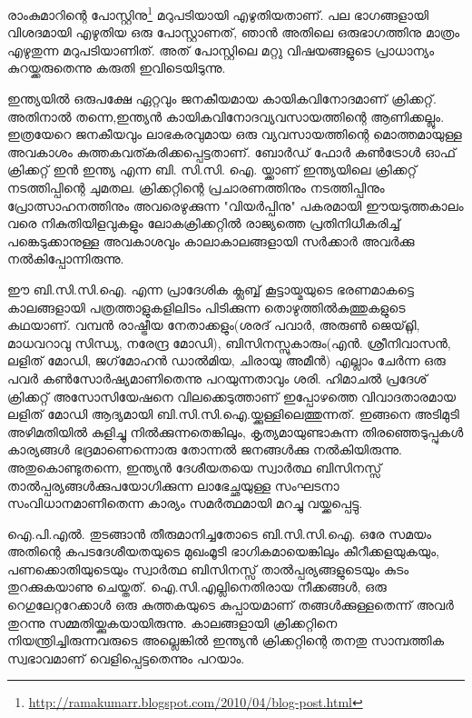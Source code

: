 \vskip 2pt


രാംകുമാറിന്റെ പോസ്റ്റിനു\footnote{\url{http://ramakumarr.blogspot.com/2010/04/blog-post.html}} മറുപടിയായി എഴുതിയതാണ്. പല ഭാഗങ്ങളായി വിശദമായി എഴുതിയ ഒരു പോസ്റ്റാണത്, ഞാന്‍ അതിലെ ഒരുഭാഗത്തിനു മാത്രം എഴുതുന്ന മറുപടിയാണിത്. അത് പോസ്റ്റിലെ മറ്റു വിഷയങ്ങളുടെ പ്രാധാന്യം കുറയ്ക്കരുതെന്നു കരുതി ഇവിടെയിടുന്നു.

ഇന്ത്യയില്‍ ഒരുപക്ഷേ ഏറ്റവും ജനകീയമായ കായികവിനോദമാണ് ക്രിക്കറ്റ്. അതിനാല്‍ തന്നെ,ഇന്ത്യന്‍ കായികവിനോദവ്യവസായത്തിന്റെ ആണിക്കല്ലും. ഇത്രയേറെ ജനകീയവും ലാഭകരവുമായ ഒരു വ്യവസായത്തിന്റെ മൊത്തമായുള്ള അവകാശം കുത്തകവത്കരിക്കപ്പെട്ടതാണ്. ബോര്‍ഡ് ഫോര്‍ കണ്‍ട്രോള്‍ ഓഫ് ക്രിക്കറ്റ് ഇന്‍ ഇന്ത്യ എന്ന ബി. സി.സി. ഐ. യ്ക്കാണ് ഇന്ത്യയിലെ ക്രിക്കറ്റ് നടത്തിപ്പിന്റെ ചുമതല. ക്രിക്കറ്റിന്റെ പ്രചാരണത്തിനും നടത്തിപ്പിനും പ്രോത്സാഹനത്തിനും അവരെഴുക്കുന്ന "വിയര്‍പ്പിനു" പകരമായി ഈയടുത്തകാലം വരെ നികുതിയിളവുകളും ലോകക്രിക്കറ്റില്‍ രാജ്യത്തെ പ്രതിനിധീകരിച്ച് പങ്കെടുക്കാനുള്ള അവകാശവും കാലാകാലങ്ങളായി സര്‍ക്കാര്‍ അവര്‍ക്കു നല്‍കിപ്പോന്നിരുന്നു.

ഈ ബി.സി.സി.ഐ. എന്ന പ്രാദേശിക ക്ലബ്ബ് കൂട്ടായ്മയുടെ ഭരണമാകട്ടെ കാലങ്ങളായി പത്രത്താളുകളിലിടം പിടിക്കുന്ന തൊഴുത്തില്‍കുത്തുകളുടെ കഥയാണ്. വമ്പന്‍ രാഷ്ട്രീയ നേതാക്കളും(ശരദ് പവാര്‍, അരുണ്‍ ജെയ്റ്റ്ലി, മാധവറാവു സിന്ധ്യ, നരേന്ദ്ര മോഡി), ബിസിനസ്സുകാരും(എന്‍. ശ്രീനിവാസന്‍, ലളിത് മോഡി, ജഗ്‌മോഹന്‍ ഡാല്‍മിയ, ചിരായു അമീന്‍) എല്ലാം ചേര്‍ന്ന ഒരു പവര്‍ കണ്‍സോര്‍ഷ്യമാണിതെന്നു പറയുന്നതാവും ശരി. ഹിമാചല്‍ പ്രദേശ് ക്രിക്കറ്റ് അസോസിയേഷനെ വിലക്കെടുത്താണ് ഇപ്പോഴത്തെ വിവാദതാരമായ ലളിത് മോഡി ആദ്യമായി ബി.സി.സി.ഐ.യ്ക്കുള്ളിലെത്തുന്നത്. ഇങ്ങനെ അടിമുടി അഴിമതിയില്‍ കുളിച്ചു നില്‍ക്കുന്നതെങ്കിലും, കൃത്യമായുണ്ടാകുന്ന തിരഞ്ഞെടുപ്പുകള്‍ കാര്യങ്ങള്‍ ഭദ്രമാണെന്നൊരു തോന്നല്‍ ജനങ്ങള്‍ക്കു നല്‍കിയിരുന്നു. അതുകൊണ്ടുതന്നെ, ഇന്ത്യന്‍ ദേശീയതയെ സ്വാര്‍ത്ഥ ബിസിനസ്സ് താല്‍പ്പര്യങ്ങള്‍ക്കുപയോഗിക്കുന്ന ലാഭേച്ഛയുള്ള സംഘടനാ സംവിധാനമാണിതെന്ന കാര്യം സമര്‍ത്ഥമായി മറച്ചു വയ്ക്കപ്പെട്ടു.

ഐ.പി.എല്‍. തുടങ്ങാന്‍ തീരുമാനിച്ചതോടെ ബി.സി.സി.ഐ. ഒരേ സമയം അതിന്റെ കപടദേശീയതയുടെ മുഖംമൂടി ഭാഗികമായെങ്കിലും കീറീക്കളയുകയും, പണക്കൊതിയുടെയും സ്വാര്‍ത്ഥ ബിസിനസ്സ് താല്‍പ്പര്യങ്ങളുടെയും കുടം തുറക്കുകയാണു ചെയ്തത്. ഐ.സി.എല്ലിനെതിരായ നീക്കങ്ങള്‍, ഒരു റെഗുലേറ്ററേക്കാള്‍ ഒരു കുത്തകയുടെ കുപ്പായമാണ് തങ്ങള്‍ക്കുള്ളതെന്ന് അവര്‍ തുറന്നു സമ്മതിയ്ക്കുകയായിരുന്നു. കാലങ്ങളായി ക്രിക്കറ്റിനെ നിയന്ത്രിച്ചിരുന്നവരുടെ അല്ലെങ്കില്‍ ഇന്ത്യന്‍ ക്രിക്കറ്റിന്റെ തനതു സാമ്പത്തിക സ്വഭാവമാണ് വെളിപ്പെട്ടതെന്നും പറയാം.

